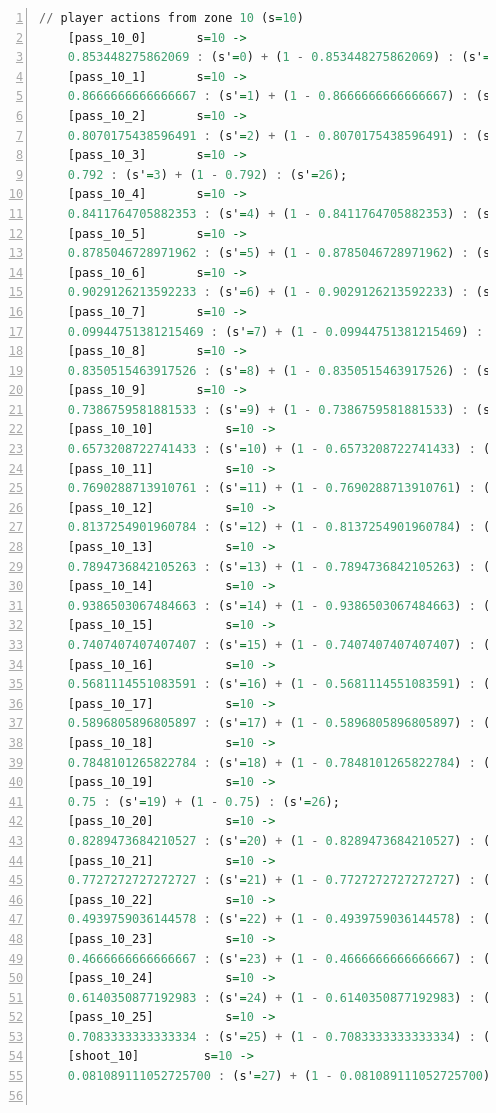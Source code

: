 \documentclass{l4proj}
\begin{document}
\begin{appendices}
\begin{lstlisting}[language=Haskell, numbers=left, caption=MDP used for strategy generation. This is the model specification as-is after the refinements at the end of chapter 3.]
	// player actions from zone 10 (s=10)
	[pass_10_0]	      s=10 ->
	0.853448275862069 : (s'=0) + (1 - 0.853448275862069) : (s'=26);
	[pass_10_1]	      s=10 ->
	0.8666666666666667 : (s'=1) + (1 - 0.8666666666666667) : (s'=26);
	[pass_10_2]	      s=10 ->
	0.8070175438596491 : (s'=2) + (1 - 0.8070175438596491) : (s'=26);
	[pass_10_3]	      s=10 ->
	0.792 : (s'=3) + (1 - 0.792) : (s'=26);
	[pass_10_4]	      s=10 ->
	0.8411764705882353 : (s'=4) + (1 - 0.8411764705882353) : (s'=26);
	[pass_10_5]	      s=10 ->
	0.8785046728971962 : (s'=5) + (1 - 0.8785046728971962) : (s'=26);
	[pass_10_6]	      s=10 ->
	0.9029126213592233 : (s'=6) + (1 - 0.9029126213592233) : (s'=26);
	[pass_10_7]	      s=10 ->
	0.09944751381215469 : (s'=7) + (1 - 0.09944751381215469) : (s'=26);
	[pass_10_8]	      s=10 ->
	0.8350515463917526 : (s'=8) + (1 - 0.8350515463917526) : (s'=26);
	[pass_10_9]	      s=10 ->
	0.7386759581881533 : (s'=9) + (1 - 0.7386759581881533) : (s'=26);
	[pass_10_10]	      s=10 ->
	0.6573208722741433 : (s'=10) + (1 - 0.6573208722741433) : (s'=26);
	[pass_10_11]	      s=10 ->
	0.7690288713910761 : (s'=11) + (1 - 0.7690288713910761) : (s'=26);
	[pass_10_12]	      s=10 ->
	0.8137254901960784 : (s'=12) + (1 - 0.8137254901960784) : (s'=26);
	[pass_10_13]	      s=10 ->
	0.7894736842105263 : (s'=13) + (1 - 0.7894736842105263) : (s'=26);
	[pass_10_14]	      s=10 ->
	0.9386503067484663 : (s'=14) + (1 - 0.9386503067484663) : (s'=26);
	[pass_10_15]	      s=10 ->
	0.7407407407407407 : (s'=15) + (1 - 0.7407407407407407) : (s'=26);
	[pass_10_16]	      s=10 ->
	0.5681114551083591 : (s'=16) + (1 - 0.5681114551083591) : (s'=26);
	[pass_10_17]	      s=10 ->
	0.5896805896805897 : (s'=17) + (1 - 0.5896805896805897) : (s'=26);
	[pass_10_18]	      s=10 ->
	0.7848101265822784 : (s'=18) + (1 - 0.7848101265822784) : (s'=26);
	[pass_10_19]	      s=10 ->
	0.75 : (s'=19) + (1 - 0.75) : (s'=26);
	[pass_10_20]	      s=10 ->
	0.8289473684210527 : (s'=20) + (1 - 0.8289473684210527) : (s'=26);
	[pass_10_21]	      s=10 ->
	0.7727272727272727 : (s'=21) + (1 - 0.7727272727272727) : (s'=26);
	[pass_10_22]	      s=10 ->
	0.4939759036144578 : (s'=22) + (1 - 0.4939759036144578) : (s'=26);
	[pass_10_23]	      s=10 ->
	0.4666666666666667 : (s'=23) + (1 - 0.4666666666666667) : (s'=26);
	[pass_10_24]	      s=10 ->
	0.6140350877192983 : (s'=24) + (1 - 0.6140350877192983) : (s'=26);
	[pass_10_25]	      s=10 ->
	0.7083333333333334 : (s'=25) + (1 - 0.7083333333333334) : (s'=26);
	[shoot_10]	       s=10 ->
	0.081089111052725700 : (s'=27) + (1 - 0.081089111052725700) : (s'=26);


\end{lstlisting}
\end{appendices}
\end{document}
